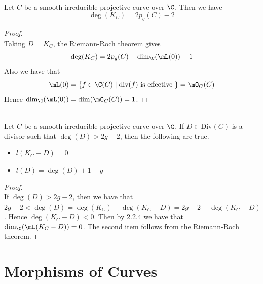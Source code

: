 \documentclass[a4paper]{article}
\begin{document}
\begin{prp}{}{}\\
Let $C$ be a smooth irreducible projective curve over $\C$. Then we have $$\deg(K_C)=2p_g(C)-2$$
\begin{proof}\\
Taking $D=K_C$, the Riemann-Roch theorem gives $$\deg(K_C)=2p_g(C)-\dim_\C(\mL(0))-1$$ Also we have that $$\mL(0)=\{f\in\C(C)\;|\;\text{div}(f)\text{ is effective }\}=\mO_C(C)$$ Hence $\dim_\C(\mL(0))=\dim(\mO_C(C))=1$. 
\end{proof}
\end{prp}

\begin{lmm}{}{}\\
Let $C$ be a smooth irreducible projective curve over $\C$. If $D\in\text{Div}(C)$ is a divisor such that $\deg(D)>2g-2$, then the following are true. 
\begin{itemize}
\item $l(K_C-D)=0$
\item $l(D)=\deg(D)+1-g$
\end{itemize}
\begin{proof}\\
If $\deg(D)>2g-2$, then we have that $2g-2<\deg(D)=\deg(K_C)-\deg(K_C-D)=2g-2-\deg(K_C-D)$. Hence $\deg(K_C-D)<0$. Then by 2.2.4 we have that $\dim_\C(\mL(K_C-D))=0$. The second item follows from the Riemann-Roch theorem. 
\end{proof}
\end{lmm}

\pagebreak
\section{Morphisms of Curves}
\end{document}
